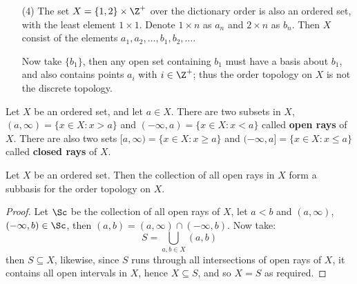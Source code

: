 \begin{example}
\begin{enumerate}
         \item[(4)] The set  $X=\{1,2\} \times \Z^+$ over the dictionary order is also an ordered set,
             with the least element  $1 \times 1$. Denote  $1 \times n$ as  $a_n$ and  $2 \times n$ as
              $b_n$. Then  $X$ consist of the elements  $a_1,a_2, \dots,b_1,b_2,\dots$.

              Now take $\{b_1\}$, then any open set containing $b_1$ must have a basis
              about $b_1$, and also contains points $a_i$ with  $i \in \Z^+$; thus the
              order topology on  $X$ is not the discrete topology.
    \end{enumerate}
\end{example}

\begin{definition}
    Let $X$ be an ordered set, and let  $a \in X$. There are two subsets in  $X$,
    $(a,\infty)=\{x \in X: x>a\}$ and $(-\infty,a)=\{x \in X: x<a\}$ called \textbf{open rays} of $X$.
    There are also two sets $[a,\infty)=\{x \in X: x \geq a\}$ and $(-\infty,a]=\{x \in X: x \leq a\}$
    called \textbf{closed rays} of $X$.
\end{definition}

\begin{theorem}\label{1.3.2}
    Let $X$ be an ordered set. Then the collection of all open rays in  $X$ form
    a subbasis for the order topology on  $X$.
\end{theorem}
\begin{proof}
    Let $\Sc$ be the collection of all open rays of  $X$, let $a<b$ and
    $(a,\infty)$, $(-\infty,b) \in \Sc$, then  $(a,b)=(a,\infty) \cap
    (-\infty,b)$. Now take:
        \begin{equation*}
            S=\bigcup_{a,b \in X}{(a,b)}
        \end{equation*}
    then $S \subseteq X$, likewise, since  $S$ runs through all intersections of open rays
    of $X$, it contains all open intervals in  $X$, hence  $X \subseteq S$, and so  $X=S$
    as required.
\end{proof}
